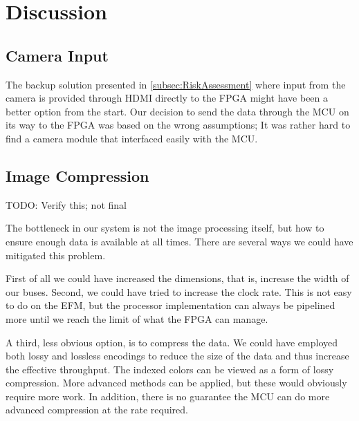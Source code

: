 \section{Discussion}

\subsection{Camera Input}
The backup solution presented in \ref{subsec:RiskAssessment} where input from the camera is provided through HDMI directly to the FPGA might have been a better option from the start.
Our decision to send the data through the MCU on its way to the FPGA was based on the wrong assumptions; It was rather hard to find a camera module that interfaced easily with the MCU.


\subsection{Image Compression}
TODO: Verify this; not final

The bottleneck in our system is not the image processing itself, but how to ensure enough data is available at all times.
There are several ways we could have mitigated this problem.

First of all we could have increased the dimensions, that is, increase the width of our buses. Second, we could have tried to increase the clock rate. This is not easy to do on the EFM, but the processor implementation can always be pipelined more until we reach the limit of what the FPGA can manage.

A third, less obvious option, is to compress the data. We could have employed both lossy and lossless encodings to reduce the size of the data and thus increase the effective throughput. The indexed colors can be viewed as a form of lossy compression.
More advanced methods can be applied, but these would obviously require more work.
In addition, there is no guarantee the MCU can do more advanced compression at the rate required.
